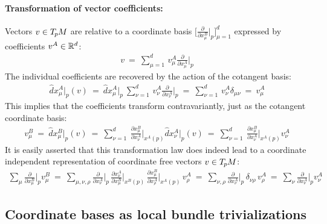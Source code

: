 \paragraph{Transformation of vector coefficients:}
Vectors $v \in T_{\mkern-1.5mu p}\mkern-.5muM$ are relative to a coordinate basis
$\big[\frac{\partial}{\partial x^B_\mu} \big|_p \big]_{\mu=1}^d$
expressed by coefficients $v^A \in \mathbb{R}^d$:
\begin{align}
    v\ =\
    \sum_{\mu=1}^d \,
    v_\mu^A \frac{\partial}{\partial x^A_\mu} \bigg|_p
\end{align}
The individual coefficients are recovered by the action of the cotangent basis:
\begin{align}
    \hat{d}x^A_\mu \big|_p(v)
    \ =\ \hat{d}x^A_\mu \big|_p\ \sum_{\nu=1}^d \, v_\nu^A \frac{\partial}{\partial x^A_\nu} \bigg|_p
    \ =\ \sum_{\nu=1}^d \, v_\nu^A \delta_{\mu\nu}
    \ =\ v^A_\mu
\end{align}
This implies that the coefficients transform contravariantly, just as the cotangent coordinate basis:
\begin{align}
    v^B_\mu
    \ =\ \hat{d}x^B_\mu \big|_p (v)
    \ =\ \sum_{\nu=1}^d\ 
        \frac{\partial x^B_\mu}{\partial x^A_\nu} \bigg|_{x^A(p)}
        \hat{d}x^A_\nu|_p (v)
    \ =\ \sum_{\nu=1}^d\ 
        \frac{\partial x^B_\mu}{\partial x^A_\nu} \bigg|_{x^A(p)}
        v^A_\nu
\end{align}
It is easily asserted that this transformation law does indeed lead to a coordinate independent representation of coordinate free vectors $v\in T_{\mkern-1.5mu p}\mkern-.5muM$:
\begin{align}
    \sum_\mu \frac{\partial}{\partial x^B_\mu} \bigg|_p v_\mu^B
    \ =\ \sum_{\mu,\nu,\rho} \frac{\partial}{\partial x^A_\nu} \bigg|_p \,
        \frac{\partial x^A_\nu}{\partial x^B_\mu} \bigg|_{x^B(p)} \,
        \frac{\partial x^B_\mu}{\partial x^A_\rho} \bigg|_{x^A(p)} \,
        v^A_\rho
    \ =\ \sum_{\nu,\rho} \frac{\partial}{\partial x^A_\nu} \bigg|_p \,
        \delta_{\nu\rho} \,
        v^A_\rho
    \ =\ \sum_\nu \frac{\partial}{\partial x^A_\nu} \bigg|_p v_\nu^A
\end{align}



















\subsection{Coordinate bases as local bundle trivializations}
\label{apx:correspondences_bundle_trivializations}

